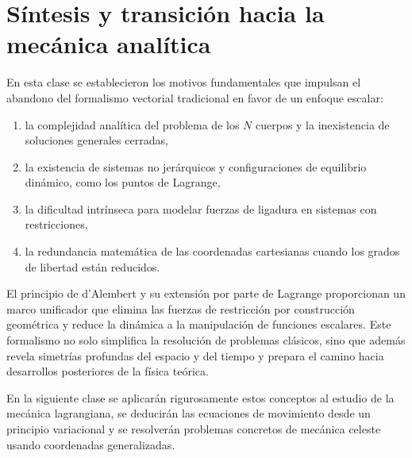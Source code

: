 \section{Síntesis y transición hacia la mecánica analítica}
En esta clase se establecieron los motivos fundamentales que impulsan el abandono del formalismo vectorial tradicional en favor de un enfoque escalar:
\begin{enumerate}
    \item la complejidad analítica del problema de los \(N\) cuerpos y la inexistencia de soluciones generales cerradas,
    \item la existencia de sistemas no jerárquicos y configuraciones de equilibrio dinámico, como los puntos de Lagrange,
    \item la dificultad intrínseca para modelar fuerzas de ligadura en sistemas con restricciones,
    \item la redundancia matemática de las coordenadas cartesianas cuando los grados de libertad están reducidos.
\end{enumerate}

El principio de d'Alembert y su extensión por parte de Lagrange proporcionan un marco unificador que elimina las fuerzas de restricción por construcción geométrica y reduce la dinámica a la manipulación de funciones escalares. Este formalismo no solo simplifica la resolución de problemas clásicos, sino que además revela simetrías profundas del espacio y del tiempo y prepara el camino hacia desarrollos posteriores de la física teórica.

En la siguiente clase se aplicarán rigurosamente estos conceptos al estudio de la mecánica lagrangiana, se deducirán las ecuaciones de movimiento desde un principio variacional y se resolverán problemas concretos de mecánica celeste usando coordenadas generalizadas.